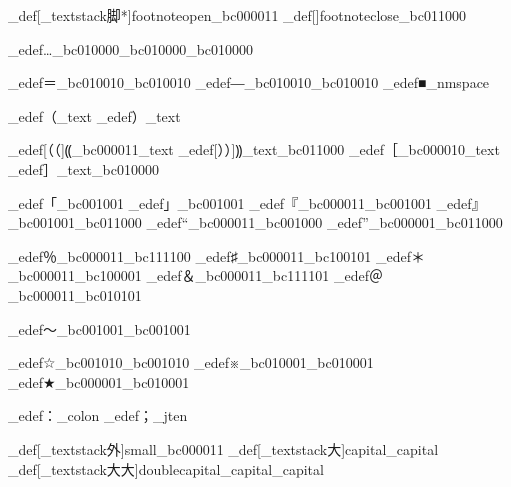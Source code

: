 
\brl@char_def[\brl@char_textstack{脚}{*}]{footnoteopen}{\brl@char_bc000011}
\brl@char_def[]{footnoteclose}{\brl@char_bc011000}


\brl@char_edef{…}{\brl@char_bc010000\brl@char_bc010000\brl@char_bc010000}

\brl@char_edef{＝}{\brl@char_bc010010\brl@char_bc010010}
\brl@char_edef{―}{\brl@char_bc010010\brl@char_bc010010}%
\brl@char_edef{■}{\brl@char@alias_nmspace}

\brl@char_edef{（}{\brl@char@alias_text}
\brl@char_edef{）}{\brl@char@alias_text}

\brl@char_edef[（（]{⸨}{\brl@char_bc000011\brl@char@alias_text}
\brl@char_edef[））]{⸩}{\brl@char@alias_text\brl@char_bc011000}
\brl@char_edef{［}{\brl@char_bc000010\brl@char@alias_text}
\brl@char_edef{］}{\brl@char@alias_text\brl@char_bc010000}


\brl@char_edef{「}{\brl@char_bc001001}
\brl@char_edef{」}{\brl@char_bc001001}
\brl@char_edef{『}{\brl@char_bc000011\brl@char_bc001001}
\brl@char_edef{』}{\brl@char_bc001001\brl@char_bc011000}
\brl@char_edef{“}{\brl@char_bc000011\brl@char_bc001000}
\brl@char_edef{”}{\brl@char_bc000001\brl@char_bc011000}






\brl@char_edef{％}{\brl@char_bc000011\brl@char_bc111100}
\brl@char_edef{♯}{\brl@char_bc000011\brl@char_bc100101}
\brl@char_edef{＊}{\brl@char_bc000011\brl@char_bc100001}
\brl@char_edef{＆}{\brl@char_bc000011\brl@char_bc111101}
\brl@char_edef{＠}{\brl@char_bc000011\brl@char_bc010101}


\brl@char_edef{〜}{\brl@char_bc001001\brl@char_bc001001}%

\brl@char_edef{☆}{\brl@char_bc001010\brl@char_bc001010}
\brl@char_edef{※}{\brl@char_bc010001\brl@char_bc010001}
\brl@char_edef{★}{\brl@char_bc000001\brl@char_bc010001}



\brl@char_edef{：}{\brl@char@alias_colon}
\brl@char_edef{；}{\brl@char@alias_jten}




\brl@char_def[\brl@char_textstack{外}{}]{small}{\brl@char_bc000011}
\brl@char_def[\brl@char_textstack{大}{}]{capital}{\brl@char@alias_capital}
\brl@char_def[\brl@char_textstack{大大}{}]{doublecapital}{\brl@char@alias_capital\brl@char@alias_capital}

